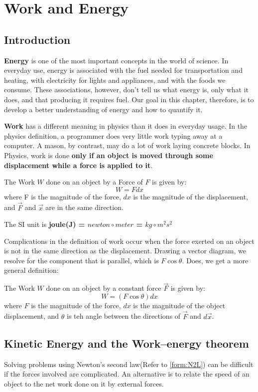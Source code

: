 \section{Work and Energy}

\subsection{Introduction}
\textbf{Energy} is one of the most important concepts in the world of science. In everyday use, energy is associated with the fuel needed for transportation and heating, with electricity for lights and appliances, and with the foods we consume. These associations, however, don't tell us what energy is, only what it does, and that producing it requires fuel. Our goal in this chapter, therefore, is to develop a better understanding of energy and how to quantify it.

\textbf{Work} has a different meaning in physics than it does in everyday usage. In the physics definition, a programmer does very little work typing away at a computer. A mason, by contrast, may do a lot of work laying concrete blocks. In Physics, work is done \textbf{only if an object is moved through some displacement while a force is applied to it}.

\begin{defi}
The Work $W$ done on an object by a Force of $F$ is given by:
$$ W=Fd x$$
where F is the magnitude of the force, $d x$ is the magnitude of the displacement, and $\vec{F}$ and $\vec{x}$ are in the same direction.

The SI unit is \textbf{joule(J) = $newton \circ meter$ = $kg \circ m^2 s^2$}
\end{defi}

Complications in the definition of work occur when the force exerted on an object is not in the same direction as the displacement. Drawing a vector diagram, we resolve for the component that is parallel, which is $F\cos \theta$. Does, we get a more general definition:

\begin{defi} \label{defi::workgen}
The Work $W$ done on an object by a constant force $\vec{F}$ is given by:
$$W=(F \cos \theta)d x$$
where $F$ is the magnitude of the force, $d x$ is the magnitude of the object displacement, and $\theta$ is teh angle between the directions of $\vec{F}$ and $d \vec{x}$.
\end{defi}

\subsection{Kinetic Energy and the Work--energy theorem}
Solving problems using Newton's second law(Refer to \ref{form:N2L}) can be difficult if the forces involved are complicated. An alternative is to relate the speed of an object to the net work done on it by external forces.


